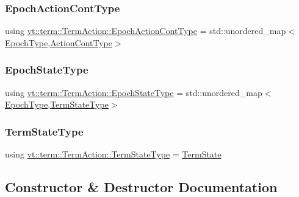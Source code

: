\subsubsection{\texorpdfstring{Epoch\+Action\+Cont\+Type}{EpochActionContType}}
{\footnotesize\ttfamily using \hyperlink{structvt_1_1term_1_1_term_action_acefe3cb1e2a2bcf0d530082f53a2bada}{vt\+::term\+::\+Term\+Action\+::\+Epoch\+Action\+Cont\+Type} =  std\+::unordered\+\_\+map$<$\hyperlink{namespacevt_a985a5adf291c34a3ca263b3378388236}{Epoch\+Type},\hyperlink{structvt_1_1term_1_1_term_action_a3b7ff49ce82fc33a7a1ebda8797c02b7}{Action\+Cont\+Type}$>$}

\mbox{\label{structvt_1_1term_1_1_term_action_afcbc07a9b40ff2b6d53e9522877a745d}} 
\subsubsection{\texorpdfstring{Epoch\+State\+Type}{EpochStateType}}
{\footnotesize\ttfamily using \hyperlink{structvt_1_1term_1_1_term_action_afcbc07a9b40ff2b6d53e9522877a745d}{vt\+::term\+::\+Term\+Action\+::\+Epoch\+State\+Type} =  std\+::unordered\+\_\+map$<$\hyperlink{namespacevt_a985a5adf291c34a3ca263b3378388236}{Epoch\+Type},\hyperlink{structvt_1_1term_1_1_term_action_ae4c635b69751d887666814700ed64d65}{Term\+State\+Type}$>$}

\mbox{\label{structvt_1_1term_1_1_term_action_ae4c635b69751d887666814700ed64d65}} 
\subsubsection{\texorpdfstring{Term\+State\+Type}{TermStateType}}
{\footnotesize\ttfamily using \hyperlink{structvt_1_1term_1_1_term_action_ae4c635b69751d887666814700ed64d65}{vt\+::term\+::\+Term\+Action\+::\+Term\+State\+Type} =  \hyperlink{structvt_1_1term_1_1_term_state}{Term\+State}}



\subsection{Constructor \& Destructor Documentation}
\mbox{\label{structvt_1_1term_1_1_term_action_ac0b0f4271452cfbea674c6a7c4f50a4b}} 
